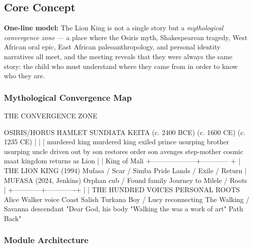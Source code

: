\documentclass[11pt,letterpaper]{article}
\begin{document}
\subsection{Core Concept}

\begin{quotebox}
\textbf{One-line model:} The Lion King is not a single story but a \textit{mythological convergence zone} --- a place where the Osiris myth, Shakespearean tragedy, West African oral epic, East African paleoanthropology, and personal identity narratives all meet, and the meeting reveals that they were always the same story: the child who must understand where they came from in order to know who they are.
\end{quotebox}

\subsubsection{Mythological Convergence Map}

\begin{asciibox}
                    THE CONVERGENCE ZONE
                    
  OSIRIS/HORUS          HAMLET          SUNDIATA KEITA
  (c. 2400 BCE)        (c. 1600 CE)    (c. 1235 CE)
       |                    |                |
  murdered king        murdered king    exiled prince
  usurping brother     usurping uncle   driven out by
  son restores order   son avenges      step-mother
  cosmic maat          kingdom          returns as Lion
       |                    |            King of Mali
       +--------------------+------------ + 
                            |
                    THE LION KING (1994)
                    Mufasa / Scar / Simba
                    Pride Lands / Exile / Return
                            |
                    MUFASA (2024, Jenkins)
                    Orphan cub / Found family
                    Journey to Milele / Roots
                            |
               +------------+-------------+
               |                          |
       THE HUNDRED VOICES         PERSONAL ROOTS
       Alice Walker voice          Coast Salish
       Turkana Boy / Lucy          reconnecting
       The Walking / Savanna       descendant
       "Dear God, his body         "Walking the
        was a work of art"          Path Back"
\end{asciibox}

\subsubsection{Module Architecture}
\end{document}

